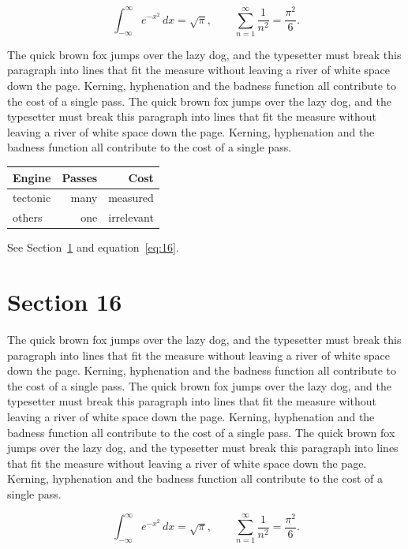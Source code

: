 \documentclass{article}
\begin{document}
\begin{equation}\label{eq:15}
\int_{-\infty}^{\infty} e^{-x^{2}}\,dx = \sqrt{\pi}, \qquad
\sum_{n=1}^{\infty} \frac{1}{n^{2}} = \frac{\pi^{2}}{6}.
\end{equation}

The quick brown fox jumps over the lazy dog, and the typesetter must break this paragraph into lines that fit the measure without leaving a river of white space down the page. Kerning, hyphenation and the badness function all contribute to the cost of a single pass. The quick brown fox jumps over the lazy dog, and the typesetter must break this paragraph into lines that fit the measure without leaving a river of white space down the page. Kerning, hyphenation and the badness function all contribute to the cost of a single pass. 

\begin{center}
\begin{tabular}{lrr}
\toprule
Engine & Passes & Cost \\
\midrule
tectonic & many & measured \\
others & one & irrelevant \\
\bottomrule
\end{tabular}
\end{center}

See Section~\ref{sec:16} and equation~\eqref{eq:16}.
\section{Section 16}
\label{sec:16}
The quick brown fox jumps over the lazy dog, and the typesetter must break this paragraph into lines that fit the measure without leaving a river of white space down the page. Kerning, hyphenation and the badness function all contribute to the cost of a single pass. The quick brown fox jumps over the lazy dog, and the typesetter must break this paragraph into lines that fit the measure without leaving a river of white space down the page. Kerning, hyphenation and the badness function all contribute to the cost of a single pass. The quick brown fox jumps over the lazy dog, and the typesetter must break this paragraph into lines that fit the measure without leaving a river of white space down the page. Kerning, hyphenation and the badness function all contribute to the cost of a single pass. 

\begin{equation}\label{eq:16}
\int_{-\infty}^{\infty} e^{-x^{2}}\,dx = \sqrt{\pi}, \qquad
\sum_{n=1}^{\infty} \frac{1}{n^{2}} = \frac{\pi^{2}}{6}.
\end{equation}
\end{document}
